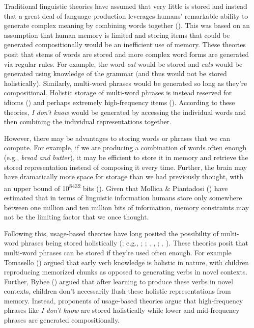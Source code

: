 \documentclass[
  12pt,
  letterpaper,
]{scrreport}
\begin{document}
Traditional linguistic theories have assumed that very little is stored
and instead that a great deal of language production leverages humans'
remarkable ability to generate complex meaning by combining words
together (). This was based on
an assumption that human memory is limited and storing items that could
be generated compositionally would be an inefficient use of memory.
These theories posit that stems of words are stored and more complex
word forms are generated via regular rules. For example, the word
\emph{cat} would be stored and \emph{cats} would be generated using
knowledge of the grammar (and thus would not be stored holistically).
Similarly, multi-word phrases would be generated so long as they're
compositional. Holistic storage of multi-word phrases is instead
reserved for idioms () and
perhaps extremely high-frequency items (). According to these theories, \emph{I don't know}
would be generated by accessing the individual words and then combining
the individual representations together.

However, there may be advantages to storing words or phrases that we can
compute. For example, if we are producing a combination of words often
enough (e.g., \emph{bread and butter}), it may be efficient to store it
in memory and retrieve the stored representation instead of composing it
every time. Further, the brain may have dramatically more space for
storage than we had previously thought, with an upper bound of
10\textsuperscript{8432} bits
().
Given that Mollica \& Piantadosi
() have estimated
that in terms of linguistic information humans store only somewhere
between one million and ten million bits of information, memory
constraints may not be the limiting factor that we once thought.

Following this, usage-based theories have long posited the possibility
of multi-word phrases being stored holistically
(; e.g.,
;
;
,
,
;
,
). These theories
posit that multi-word phrases can be stored if they're used often
enough. For example Tomasello
()
argued that early verb knowledge is holistic in nature, with children
reproducing memorized chunks as opposed to generating verbs in novel
contexts. Further, Bybee () argued that
after learning to produce these verbs in novel contexts, children don't
necessarily flush these holistic representations from memory. Instead,
proponents of usage-based theories argue that high-frequency phrases
like \emph{I don't know} are stored holistically while lower and
mid-frequency phrases are generated compositionally.
\end{document}
